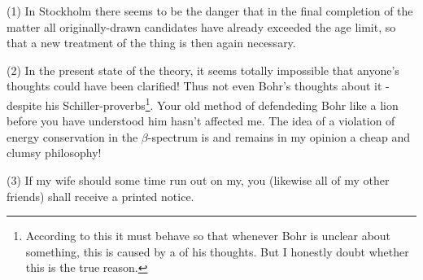 \documentclass{article}
\begin{document}
(1) In Stockholm there seems to be the danger that in the final completion of the matter all originally-drawn candidates have already exceeded the age limit, so that a new treatment of the thing is then again necessary.

(2) In the present state of the theory, it seems totally impossible that anyone's thoughts could have been clarified! Thus not even Bohr's thoughts about it - despite his Schiller-proverbs\footnote{According to this it must behave so that whenever Bohr is unclear about something, this is caused by a  of his thoughts. But I honestly doubt whether this is the true reason.}. Your old method of defendeding Bohr like a lion before you have understood him hasn't affected me. The idea of a violation of energy conservation in the $\beta$-spectrum is and remains in my opinion a cheap and clumsy philosophy!

(3) If my wife should some time run out on my, you (likewise all of my other friends) shall receive a printed notice.
\end{document}
